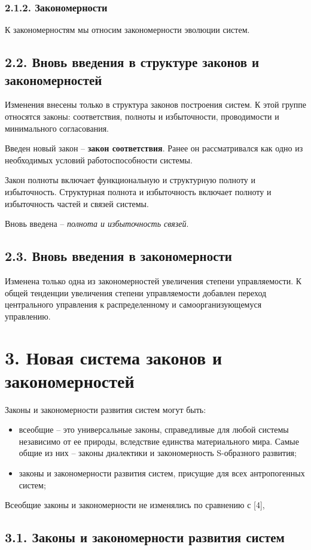 \documentclass[11pt,a4paper]{article}
\begin{document}
\subsubsection*{2.1.2. Закономерности}
К закономерностям мы относим закономерности эволюции систем.

\subsection*{2.2. Вновь введения в структуре законов и закономерностей}
Изменения внесены только в структура законов построения систем.  К этой группе
относятся законы: соответствия, полноты и избыточности, проводимости и
минимального согласования.

Введен новый закон – \textbf{закон соответствия}. Ранее он рассматривался как
одно из необходимых условий работоспособности системы.

Закон полноты включает функциональную и структурную полноту и избыточность.
Структурная полнота и избыточность включает полноту и избыточность частей и связей
системы.

Вновь введена – \emph{полнота и избыточность связей}.

\subsection*{2.3. Вновь введения в закономерности}
Изменена только одна из закономерностей увеличения степени управляемости. К
общей тенденции увеличения степени управляемости добавлен переход центрального
управления к распределенному и самоорганизующемуся управлению.

\section*{3. Новая система законов и закономерностей}
Законы и закономерности развития систем могут быть:
\begin{itemize}
\item всеобщие – это универсальные законы, справедливые для любой системы
  независимо от ее природы, вследствие единства материального мира. Самые
  общие из них – законы диалектики и закономерность S-образного развития;
\item законы и закономерности развития систем, присущие для всех антропогенных
  систем;
\end{itemize}
Всеобщие законы и закономерности не изменялись по сравнению с [4],

\subsection*{3.1. Законы и закономерности развития систем}
\end{document}
